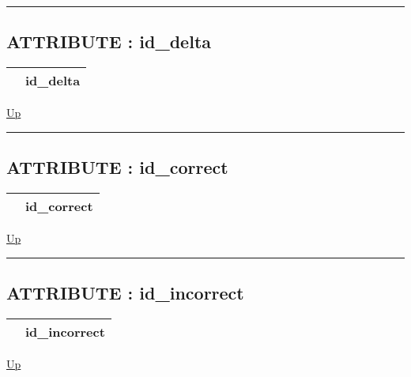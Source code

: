 \par


\rule{\textwidth}{0.4pt}
\subsection*{ATTRIBUTE : id\_delta}
\hypertarget{ecldoc:logisticregression.constants.id_delta}{}

{\renewcommand{\arraystretch}{1.5}
\begin{tabularx}{\textwidth}{|>{\raggedright\arraybackslash}l|X|}
\hline
\hspace{0pt} & id\_delta \\
\hline
\end{tabularx}
}

\hyperlink{ecldoc:LogisticRegression.Constants}{Up}

\par


\rule{\textwidth}{0.4pt}
\subsection*{ATTRIBUTE : id\_correct}
\hypertarget{ecldoc:logisticregression.constants.id_correct}{}

{\renewcommand{\arraystretch}{1.5}
\begin{tabularx}{\textwidth}{|>{\raggedright\arraybackslash}l|X|}
\hline
\hspace{0pt} & id\_correct \\
\hline
\end{tabularx}
}

\hyperlink{ecldoc:LogisticRegression.Constants}{Up}

\par


\rule{\textwidth}{0.4pt}
\subsection*{ATTRIBUTE : id\_incorrect}
\hypertarget{ecldoc:logisticregression.constants.id_incorrect}{}

{\renewcommand{\arraystretch}{1.5}
\begin{tabularx}{\textwidth}{|>{\raggedright\arraybackslash}l|X|}
\hline
\hspace{0pt} & id\_incorrect \\
\hline
\end{tabularx}
}

\hyperlink{ecldoc:LogisticRegression.Constants}{Up}

